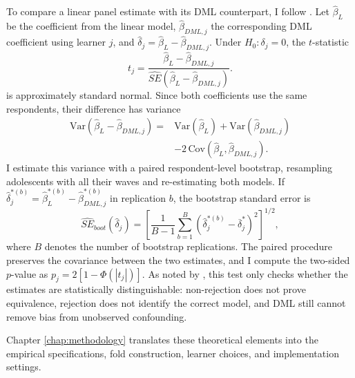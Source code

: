 \documentclass[11pt,oneside,a4paper]{book}
\begin{document}
To compare a linear panel estimate with its DML counterpart, I follow \citet{helal2026returns}. Let \(\widehat{\beta}_{L}\) be the coefficient from the linear model, \(\widehat\beta_{DML,j}\) the corresponding DML coefficient using learner \(j\), and \(\widehat\delta_j = \widehat\beta_L - \widehat\beta_{DML,j}\). Under \(H_0: \delta_j=0\), the \(t\)-statistic
\begin{equation}
t_j
=
\frac{
\widehat{\beta}_{L}-\widehat{\beta}_{DML,j}
}{
\widehat{SE}\!\left(
\widehat{\beta}_{L}-\widehat{\beta}_{DML,j}
\right)
}.
\label{eq:ols_dml_t_test}
\end{equation} is approximately standard normal. Since both coefficients use the same respondents, their difference has variance
\begin{equation}
\begin{aligned}
\mathrm{Var}\!\left(
\widehat{\beta}_{L}-\widehat{\beta}_{DML,j}
\right)
={}&
\mathrm{Var}\!\left(\widehat{\beta}_{L}\right)
+
\mathrm{Var}\!\left(\widehat{\beta}_{DML,j}\right) \\
&-
2\,\mathrm{Cov}\!\left(
\widehat{\beta}_{L},
\widehat{\beta}_{DML,j}
\right).
\end{aligned}
\label{eq:ols_dml_difference_variance}
\end{equation}
I estimate this variance with a paired respondent-level bootstrap, resampling adolescents with all their waves and re-estimating both models. If \(\widehat\delta_j^{*(b)} = \widehat\beta_L^{*(b)} - \widehat\beta_{DML,j}^{*(b)}\) in replication \(b\), the bootstrap standard error is
\begin{equation}
\widehat{SE}_{boot}\!\left(\widehat{\delta}_j\right)
=
\left[
\frac{1}{B-1}
\sum_{b=1}^{B}
\left(
\widehat{\delta}^{*(b)}_j-\overline{\delta}^{*}_j
\right)^2
\right]^{1/2},
\label{eq:ols_dml_bootstrap_se}
\end{equation}
where \(B\) denotes the number of bootstrap replications. The paired procedure preserves the covariance between the two estimates, and I compute the two-sided \(p\)-value as \(p_j = 2[1-\Phi(|t_j|)]\). As noted by \citet{helal2026returns}, this test only checks whether the estimates are statistically distinguishable: non-rejection does not prove equivalence, rejection does not identify the correct model, and DML still cannot remove bias from unobserved confounding.

Chapter \ref{chap:methodology} translates these theoretical elements into the empirical specifications, fold construction, learner choices, and implementation settings.
\end{document}
